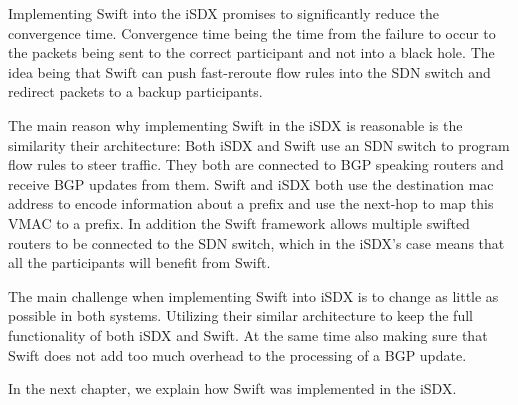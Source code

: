 Implementing Swift into the iSDX promises to significantly reduce the convergence time. Convergence time being the time from the failure to occur to the packets being sent to the correct participant and not into a black hole. The idea being that Swift can push fast-reroute flow rules into the SDN switch and redirect packets to a backup participants.

The main reason why implementing Swift in the iSDX is reasonable is the similarity their architecture: Both  iSDX and Swift use an SDN switch to program flow rules to steer traffic. They both are connected to BGP speaking routers and receive BGP updates from them. Swift and iSDX both use the destination mac address to encode information about a prefix and use the next-hop to map this VMAC to a prefix. In addition the Swift framework allows multiple swifted routers to be connected to the SDN switch, which in the iSDX's case means that all the participants will benefit from Swift.

The main challenge when implementing Swift into iSDX is to change as little as possible in both systems. Utilizing their similar architecture to keep the full functionality of both iSDX and Swift. At the same time also making sure that Swift does not add too much overhead to the processing of a BGP update.

In the next chapter, we explain how Swift was implemented in the iSDX. 
